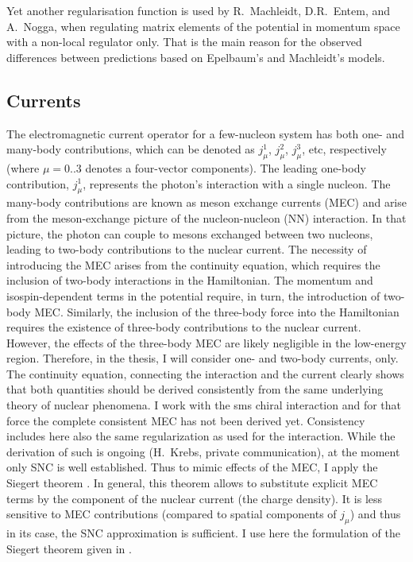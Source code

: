 
Yet another regularisation function is used by R.~Machleidt, D.R.~Entem, and A.~Nogga, 
when regulating matrix elements of the potential in momentum space with a non-local regulator only.
That is the main reason for the observed differences between predictions based on Epelbaum's
and Machleidt's models. 

\subsection*{Currents}


The electromagnetic current operator for a few-nucleon system has both one- and many-body contributions, which
can be denoted as $j_\mu^1$, $j_\mu^2$, $j_\mu^3$, etc, respectively 
(where $\mu = 0..3$ denotes a four-vector components).
The leading one-body contribution,
$j_\mu^1$, represents the photon's interaction with a single nucleon. The many-body contributions are known as
meson exchange currents (MEC) and arise from the meson-exchange picture of the nucleon-nucleon (NN)
interaction. 
In that picture, the photon can couple to mesons exchanged between two nucleons, leading to two-body contributions to
the nuclear current.
The necessity of introducing the MEC arises from the continuity equation, which requires the inclusion of
two-body interactions in the Hamiltonian. The momentum and isospin-dependent terms 
in the potential require, in turn, the
introduction of two-body MEC. Similarly, the inclusion of the three-body force into the Hamiltonian requires the
existence of three-body contributions to the nuclear current. However, the effects of the three-body MEC are
likely negligible in the low-energy region.
Therefore, in the thesis, I will consider one- and two-body currents, only.
The continuity equation, connecting the interaction and the current clearly shows 
that both quantities should be derived consistently from the same underlying theory
of nuclear phenomena.
I work with the \gls{sms} chiral interaction and for that force the complete consistent MEC
has not been derived yet.
Consistency includes here also the same regularization as used for the interaction.
While the derivation of such is ongoing (H.~Krebs, private communication), at the moment
only SNC is well established.
Thus to mimic effects of the MEC, I apply the Siegert theorem \cite{Siegert, GolakKamad2000_ExplDescr}.
In general, this theorem allows to substitute
explicit MEC terms by the  component of the nuclear current (the charge density).
It is less sensitive to MEC contributions (compared to spatial components of $j_\mu$)
and thus in its case, the SNC approximation is sufficient.
I use here the formulation of the Siegert theorem given in \cite{GolakKamad2000_ExplDescr}.


